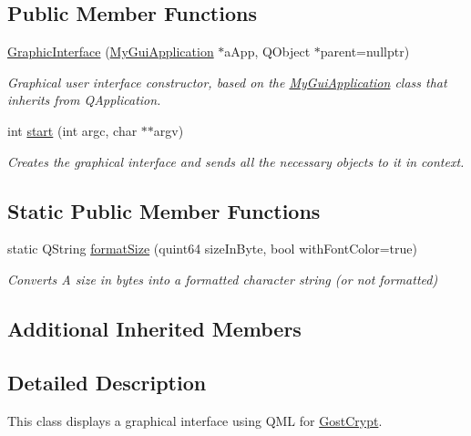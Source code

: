 \subsection*{Public Member Functions}
\begin{DoxyCompactItemize}
\item 
\hyperlink{class_graphic_interface_a7e6e90bcb56ad51c9b0cfcfb178a0e4e}{Graphic\+Interface} (\hyperlink{class_my_gui_application}{My\+Gui\+Application} $\ast$a\+App, Q\+Object $\ast$parent=nullptr)
\begin{DoxyCompactList}\small\item\em Graphical user interface constructor, based on the \hyperlink{class_my_gui_application}{My\+Gui\+Application} class that inherits from Q\+Application. \end{DoxyCompactList}\item 
int \hyperlink{class_graphic_interface_a41d17554d5ec2b24601f34304ce1c3cf}{start} (int argc, char $\ast$$\ast$argv)
\begin{DoxyCompactList}\small\item\em Creates the graphical interface and sends all the necessary objects to it in context. \end{DoxyCompactList}\end{DoxyCompactItemize}
\subsection*{Static Public Member Functions}
\begin{DoxyCompactItemize}
\item 
static Q\+String \hyperlink{class_graphic_interface_a8fb9de69c45da9b0e20c643dc84e15fa}{format\+Size} (quint64 size\+In\+Byte, bool with\+Font\+Color=true)
\begin{DoxyCompactList}\small\item\em Converts A size in bytes into a formatted character string (or not formatted) \end{DoxyCompactList}\end{DoxyCompactItemize}
\subsection*{Additional Inherited Members}


\subsection{Detailed Description}
This class displays a graphical interface using Q\+ML for \hyperlink{namespace_gost_crypt}{Gost\+Crypt}. 


